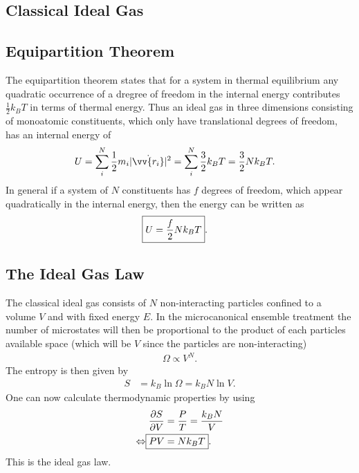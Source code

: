\documentclass[a4paper,10pt]{article}
\numberwithin{equation}{section}
\begin{document}
\begin{multicols}{2}


\section{Classical Ideal Gas}
\subsection{Equipartition Theorem}
The equipartition theorem states that for a system in thermal equilibrium any quadratic occurrence of a dregree of freedom in the internal energy contributes $\tfrac{1}{2}k_BT$ in terms of thermal energy.
Thus an ideal gas in three dimensions consisting of monoatomic constituents, which only have translational degrees of freedom, has an internal energy of
\begin{align} 
  U &= \sum_{i}^{N}\dfrac{1}{2}m_i|\dot{\vv{r_i}}|^2=\sum_{i}^{N}\dfrac{3}{2}k_BT=\dfrac{3}{2}Nk_BT
.\end{align} 
In general if a system of $N$ constituents has $f$ degrees of freedom, which appear quadratically in the internal energy, then the energy can be written as
\begin{align} 
  \Aboxed{U &= \dfrac{f}{2}Nk_BT}
.\end{align} 

\subsection{The Ideal Gas Law}
The classical ideal gas consists of $N$ non-interacting particles confined to a volume $V$ and with fixed energy $E$.
In the microcanonical ensemble treatment the number of microstates will then be proportional to the product of each particles available space (which will be $V$ since the particles are non-interacting)
\begin{align} 
  \Omega \propto V^N
.\end{align} 
The entropy is then given by
\begin{align}
  S &= k_B\ln \Omega =k_BN\ln V
.\end{align} 
One can now calculate thermodynamic properties by using
\begin{align} 
  \diffp[]{S}{V} &= \dfrac{P}{T} = \dfrac{k_BN}{V}\\
  \Leftrightarrow \Aboxed{PV &= Nk_BT}
.\end{align} 
This is the ideal gas law.


\end{multicols}
\end{document}
